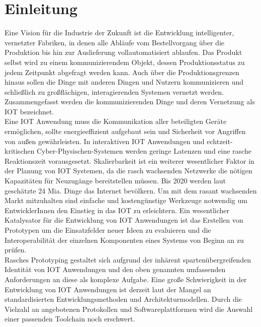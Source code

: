 \documentclass[BMR,Bachelor,ngerman]{twbook}%
\begin{document}
%
%
\chapter{Einleitung}
Eine Vision für die Industrie der Zukunft ist die Entwicklung intelligenter, vernetzter Fabriken, in denen alle Abläufe vom Bestellvorgang über die Produktion bis hin zur Auslieferung vollautomatisiert ablaufen. Das Produkt selbst wird zu einem kommunizierendem Objekt, dessen Produktionsstatus zu jedem Zeitpunkt abgefragt werden kann. Auch über die Produktionsgrenzen hinaus sollen die Dinge mit anderen Dingen und Nutzern kommunizieren und schließlich zu großflächigen, interagierenden Systemen vernetzt werden. Zusammengefasst werden die kommunizierenden Dinge und deren Vernetzung als \acf{IOT} bezeichnet.\\\newline
Eine \ac{IOT} Anwendung muss die Kommunikation aller beteiligten Geräte ermöglichen, sollte energieeffizient aufgebaut sein und Sicherheit vor Angriffen von außen gewährleisten. In interaktiven \ac{IOT} Anwendungen und echtzeit-kritischen Cyber-Physischen-Systemen werden geringe Latenzen und eine rasche Reaktionszeit vorausgesetzt. Skalierbarkeit ist ein weiterer wesentlicher Faktor in der Planung von \ac{IOT} Systemen, da die rasch wachsenden Netzwerke die nötigen Kapazitäten für Neuzugänge bereitstellen müssen. Bis 2020 werden laut  geschätzte 24 Mia. Dinge das Internet bevölkern. Um mit dem rasant wachsenden Markt mitzuhalten sind einfache und kostengünstige Werkzeuge notwendig um EntwicklerInnen den Einstieg in das \ac{IOT} zu erleichtern. Ein wesentlicher Katalysator für die Entwicklung von \ac{IOT} Anwendungen ist das Erstellen von Prototypen um die Einsatzfelder neuer Ideen zu evaluieren und die Interoperabilität der einzelnen Komponenten eines Systems von Beginn an zu prüfen.\\\newline
%
Rasches Prototyping gestaltet sich aufgrund der inhärent spartenübergreifenden Identität von \ac{IOT} Anwendungen und den oben genannten umfassenden Anforderungen an diese als komplexe Aufgabe. Eine große Schwierigkeit in der Entwicklung von \ac{IOT} Anwendungen ist derzeit laut  der Mangel an standardisierten Entwicklungsmethoden und Architekturmodellen. Durch die Vielzahl an angebotenen Protokollen und Softwareplattformen wird die Auswahl einer passenden Toolchain noch erschwert.\\\newline
\end{document}

